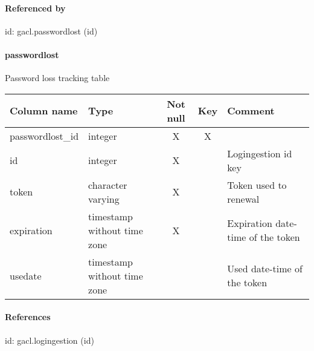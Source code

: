 \paragraph{Referenced by}
id: gacl.passwordlost (id)

\paragraph{passwordlost}
Password loss tracking table

\begin{tabular}{|l| p{2cm}|c|c| p{5cm}|}
\hline
Column name & Type & Not null & Key & Comment \\
\hline
passwordlost\_id & integer & X & X & \\
id & integer & X &  & Logingestion id key\\
token & character varying & X &  & Token used to renewal\\
expiration & timestamp without time zone & X &  & Expiration date-time of the token\\
usedate & timestamp without time zone &  &  & Used date-time of the token\\
\hline
\end{tabular}
\paragraph{References}
id: gacl.logingestion (id)

